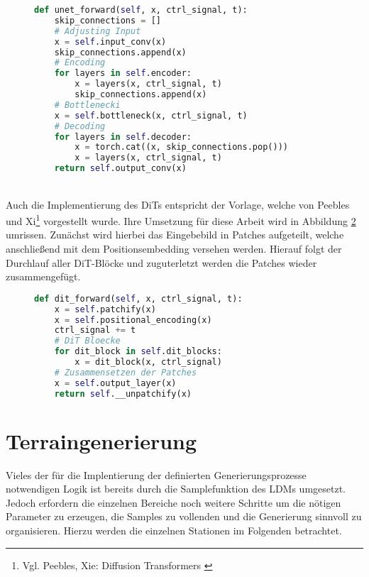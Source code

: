 \begin{figure}[htbp]
\begin{lstlisting}[language=python]
def unet_forward(self, x, ctrl_signal, t):
    skip_connections = []
    # Adjusting Input
    x = self.input_conv(x)
    skip_connections.append(x)
    # Encoding
    for layers in self.encoder:
        x = layers(x, ctrl_signal, t)
        skip_connections.append(x)
    # Bottlenecki
    x = self.bottleneck(x, ctrl_signal, t)
    # Decoding
    for layers in self.decoder:
        x = torch.cat((x, skip_connections.pop())) 
        x = layers(x, ctrl_signal, t)
    return self.output_conv(x)
\end{lstlisting}
    \captionsetup{type=figure}
    \label{fig:UNET_forward}
\end{figure} \\
Auch die Implementierung des \ac{DiT}s entspricht der Vorlage, welche von Peebles und Xi\footnote{
    Vgl. Peebles, Xie: Diffusion Transformers
    \cite{peebles2023scalable}
} vorgestellt wurde. Ihre Umsetzung für diese Arbeit wird in Abbildung \ref{fig:DiT_forward} umrissen. Zunächst wird hierbei das Eingebebild in Patches aufgeteilt, welche anschließend mit dem Positionsembedding versehen werden. Hierauf folgt der Durchlauf aller DiT-Blöcke und zuguterletzt werden die Patches wieder zusammengefügt. 
\begin{figure}[htbp]
\begin{lstlisting}[language=python]
def dit_forward(self, x, ctrl_signal, t):
    x = self.patchify(x)
    x = self.positional_encoding(x)
    ctrl_signal += t
    # DiT Bloecke
    for dit_block in self.dit_blocks:
        x = dit_block(x, ctrl_signal)
    # Zusammensetzen der Patches
    x = self.output_layer(x)
    return self.__unpatchify(x)
\end{lstlisting}
    \captionsetup{type=figure}
    \label{fig:DiT_forward}
\end{figure}

\section {Terraingenerierung}

Vieles der für die Implentierung der definierten Generierungsprozesse notwendigen Logik ist bereits durch die Samplefunktion des \ac{LDM}s umgesetzt. Jedoch erfordern die einzelnen Bereiche noch weitere Schritte um die nötigen Parameter zu erzeugen, die Samples zu vollenden und die Generierung sinnvoll zu organisieren. Hierzu werden die einzelnen Stationen im Folgenden betrachtet.


